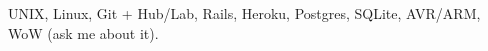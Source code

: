 \item[Systems:] UNIX, Linux, Git + Hub/Lab, Rails, Heroku, Postgres, SQLite,
AVR/ARM, WoW (ask me about it).
